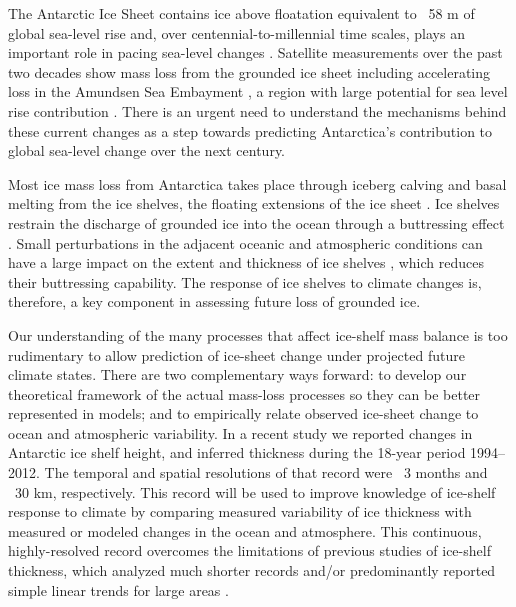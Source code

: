 The Antarctic Ice Sheet contains ice above floatation equivalent to ~58 m of global sea-level rise \parencite{Fretwell2013} and, over centennial-to-millennial time scales, plays an important role in pacing sea-level changes \parencite{Alley2005}. Satellite measurements over the past two decades show mass loss from the grounded ice sheet \parencite{Shepherd2012} including accelerating loss in the Amundsen Sea Embayment \parencite{Sutterley2014}, a region with large potential for sea level rise contribution \parencite{Rignot2014, Joughin2014}. There is an urgent need to understand the mechanisms behind these current changes as a step towards predicting Antarctica's contribution to global sea-level change over the next century. 

Most ice mass loss from Antarctica takes place through iceberg calving and basal melting from the ice shelves, the floating extensions of the ice sheet \parencite{Depoorter2013, Joughin2012, Rignot2013}. Ice shelves restrain the discharge of grounded ice into the ocean through a buttressing effect \parencite{Joughin2011, Schoof2007}. Small perturbations in the adjacent oceanic and atmospheric conditions can have a large impact on the extent and thickness of ice shelves \parencite{Dutrieux2014, Rignot2004, Scambos2004}, which reduces their buttressing capability. The response of ice shelves to climate changes is, therefore, a key component in assessing future loss of grounded ice.

Our understanding of the many processes that affect ice-shelf mass balance is too rudimentary to allow prediction of ice-sheet change under projected future climate states. There are two complementary ways forward: to develop our theoretical framework of the actual mass-loss processes so they can be better represented in models; and to empirically relate observed ice-sheet change to ocean and atmospheric variability. In a recent study \parencite{Paolo2015} we reported changes in Antarctic ice shelf height, and inferred thickness during the 18-year period 1994--2012. The temporal and spatial resolutions of that record were ~3 months and ~30 km, respectively. This record will be used to improve knowledge of ice-shelf response to climate by comparing measured variability of ice thickness with measured or modeled changes in the ocean and atmosphere. This continuous, highly-resolved record overcomes the limitations of previous studies of ice-shelf thickness, which analyzed much shorter records and/or predominantly reported simple linear trends for large areas \parencite{Pritchard2012, Shepherd2010, Zwally2005}.

